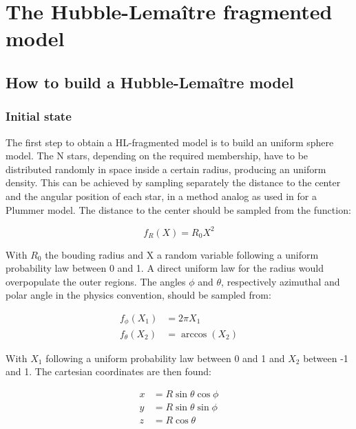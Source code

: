 
\chapter{The Hubble-Lema\^itre fragmented model} 
\label{ChapterHL}

\section{How to build a Hubble-Lema\^itre model}

\subsection{Initial state}

The first step to obtain a HL-fragmented model is to build an uniform sphere model. The N stars, depending on the required membership, have to be distributed randomly in space inside a certain radius, producing an uniform density. This can be achieved by sampling separately the distance to the center and the angular position of each star, in a method analog as used in \cite{Aarseth1974} for a Plummer model. The distance to the center should be sampled from the function:

\begin{equation}
f_R(X) = R_0 X^2
\end{equation} 

With $R_0$ the bouding radius and X a random variable following a uniform probability law between 0 and 1. A direct uniform law for the radius would overpopulate the outer regions. The angles $\phi$ and $\theta$, respectively azimuthal and polar angle in the physics convention, should be sampled from:


\begin{align}
f_\phi(X_1) & = 2\pi X_1\\
f_\theta(X_2) &= \arccos{ (X_2) }
\end{align}

With $X_1$ following a uniform probability law between 0 and 1 and $X_2$ between -1 and 1. The cartesian coordinates are then found:

\begin{align}
x &= R \sin{\theta} \cos{\phi}\\
y &= R \sin{\theta} \sin{\phi}\\
z &= R \cos{\theta} \\
\end{align}

